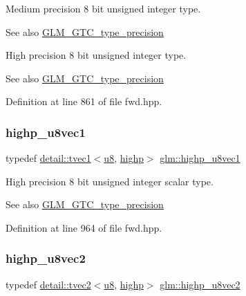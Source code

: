 Medium precision 8 bit unsigned integer type. \begin{DoxySeeAlso}{See also}
\hyperlink{group__gtc__type__precision}{G\+L\+M\+\_\+\+G\+T\+C\+\_\+type\+\_\+precision}
\end{DoxySeeAlso}
High precision 8 bit unsigned integer type. \begin{DoxySeeAlso}{See also}
\hyperlink{group__gtc__type__precision}{G\+L\+M\+\_\+\+G\+T\+C\+\_\+type\+\_\+precision} 
\end{DoxySeeAlso}


Definition at line 861 of file fwd.\+hpp.

\mbox{\label{group__gtc__type__precision_ga8e7e9156357a2b748fe39702c3bdbeec}} 
\subsubsection{\texorpdfstring{highp\+\_\+u8vec1}{highp\_u8vec1}}
{\footnotesize\ttfamily typedef \hyperlink{structglm_1_1detail_1_1tvec1}{detail\+::tvec1}$<$\hyperlink{group__gtc__type__precision_ga5e3dc67373d5068997d2d9f41c9024d2}{u8}, \hyperlink{namespaceglm_a0f04f086094c747d227af4425893f545ac6f7eab42eacbb10d59a58e95e362074}{highp}$>$ \hyperlink{group__gtc__type__precision_ga8e7e9156357a2b748fe39702c3bdbeec}{glm\+::highp\+\_\+u8vec1}}

High precision 8 bit unsigned integer scalar type. \begin{DoxySeeAlso}{See also}
\hyperlink{group__gtc__type__precision}{G\+L\+M\+\_\+\+G\+T\+C\+\_\+type\+\_\+precision} 
\end{DoxySeeAlso}


Definition at line 964 of file fwd.\+hpp.

\mbox{\label{group__gtc__type__precision_ga9aed4b3bacd37a43ec369bcf76be144a}} 
\subsubsection{\texorpdfstring{highp\+\_\+u8vec2}{highp\_u8vec2}}
{\footnotesize\ttfamily typedef \hyperlink{structglm_1_1detail_1_1tvec2}{detail\+::tvec2}$<$\hyperlink{group__gtc__type__precision_ga5e3dc67373d5068997d2d9f41c9024d2}{u8}, \hyperlink{namespaceglm_a0f04f086094c747d227af4425893f545ac6f7eab42eacbb10d59a58e95e362074}{highp}$>$ \hyperlink{group__gtc__type__precision_ga9aed4b3bacd37a43ec369bcf76be144a}{glm\+::highp\+\_\+u8vec2}}

